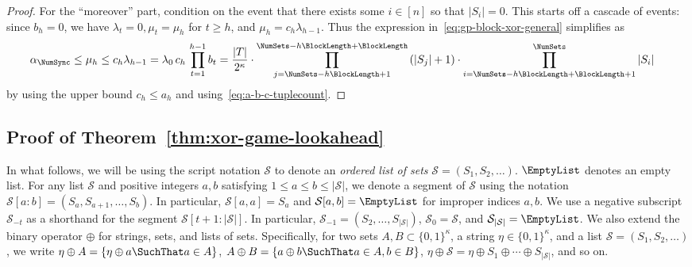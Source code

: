\begin{proof}
For the ``moreover'' part, condition on the event that there exists some $i \in [n]$ so that $|S_i| = 0$. 
This starts off a cascade of events: since $b_h = 0$, we have $\lambda_t = 0, \mu_t = \mu_h$ for $t \geq h$, 
and $\mu_h = c_h \lambda_{h-1}$. 
Thus the expression in~\eqref{eq:gp-block-xor-general} simplifies as
\begin{align*}
    \alpha_\NumSync 
    &\leq \mu_h \leq c_h \lambda_{h-1} = \lambda_0\, c_h\, \prod_{t = 1}^{h - 1}b_t 
    = \frac{|T|}{2^\kappa}\cdot 
        \prod_{j=\NumSets-h\BlockLength +1}^{\NumSets - h \BlockLength + \BlockLength}{(|S_j| + 1)} \cdot
        \prod_{i = \NumSets - h \BlockLength + \BlockLength + 1}^{\NumSets} |S_i|
\end{align*}
by using the upper bound $c_h \leq a_h$ and using~\eqref{eq:a-b-c-tuplecount}.


\end{proof}


\subsection{Proof of Theorem~\ref{thm:xor-game-lookahead}}
In what follows, we will be using the script notation $\mathcal{S}$ to denote 
an \emph{ordered list of sets} $\mathcal{S} = (S_1, S_2, \ldots)$. 
$\EmptyList$ denotes an empty list. 
For any list $\mathcal{S}$ and positive integers $a, b$ satisfying $1 \leq a \leq b \leq |\mathcal{S}|$, 
we denote a segment of $\mathcal{S}$ using the notation 
$\mathcal{S}[a:b] = (S_a, S_{a+1}, \ldots, S_b)$. 
In particular, $\mathcal{S}[a,a] = S_a$ and $\mathcal{S}[a,b] = \EmptyList$ for improper indices $a,b$.
We use a negative subscript $\mathcal{S}_{-t}$ as a shorthand for the segment $\mathcal{S}[t+1 : |\mathcal{S}|]$.
In particular, $\mathcal{S}_{-1} = (S_2, \ldots, S_{|\mathcal{S}|})$, $\mathcal{S}_0 = \mathcal{S}$, and 
$\mathcal{S}_{|\mathcal{S}|} = \EmptyList$.
We also extend the binary operator $\oplus$ for strings, sets, and lists of sets. 
Specifically, for two sets $A,B \subset \{0,1\}^\kappa$, a string $\eta \in \{0,1\}^\kappa$, 
and a list $\mathcal{S} = (S_1, S_2, \ldots)$, we write
$\eta \oplus A = \{\eta \oplus a \SuchThat a \in A\}$, 
$A \oplus B = \{a \oplus b \SuchThat a \in A, b \in B\}$, 
$\eta \oplus \mathcal{S} = \eta \oplus S_1 \oplus \cdots \oplus S_{|\mathcal{S}|}$, and so on.




